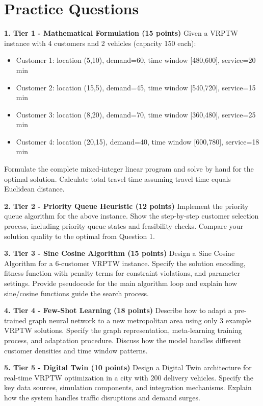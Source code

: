 \documentclass{article}
\begin{document}
\section{Practice Questions}

\textbf{1. Tier 1 - Mathematical Formulation (15 points)}
Given a VRPTW instance with 4 customers and 2 vehicles (capacity 150 each):
\begin{itemize}
\item Customer 1: location (5,10), demand=60, time window [480,600], service=20 min
\item Customer 2: location (15,5), demand=45, time window [540,720], service=15 min  
\item Customer 3: location (8,20), demand=70, time window [360,480], service=25 min
\item Customer 4: location (20,15), demand=40, time window [600,780], service=18 min
\end{itemize}
Formulate the complete mixed-integer linear program and solve by hand for the optimal solution. Calculate total travel time assuming travel time equals Euclidean distance.

\textbf{2. Tier 2 - Priority Queue Heuristic (12 points)}
Implement the priority queue algorithm for the above instance. Show the step-by-step customer selection process, including priority queue states and feasibility checks. Compare your solution quality to the optimal from Question 1.

\textbf{3. Tier 3 - Sine Cosine Algorithm (15 points)}
Design a Sine Cosine Algorithm for a 6-customer VRPTW instance. Specify the solution encoding, fitness function with penalty terms for constraint violations, and parameter settings. Provide pseudocode for the main algorithm loop and explain how sine/cosine functions guide the search process.

\textbf{4. Tier 4 - Few-Shot Learning (18 points)}
Describe how to adapt a pre-trained graph neural network to a new metropolitan area using only 3 example VRPTW solutions. Specify the graph representation, meta-learning training process, and adaptation procedure. Discuss how the model handles different customer densities and time window patterns.

\textbf{5. Tier 5 - Digital Twin (10 points)} 
Design a Digital Twin architecture for real-time VRPTW optimization in a city with 200 delivery vehicles. Specify the key data sources, simulation components, and integration mechanisms. Explain how the system handles traffic disruptions and demand surges.
\end{document}
